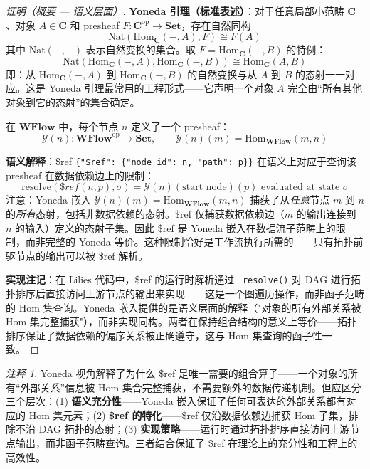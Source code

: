 \documentclass[11pt,a4paper]{article}
\theoremstyle{definition}
\theoremstyle{definition}
\theoremstyle{remark}
\newtheorem{remark}[theorem]{注释}
\newcommand{\cat}[1]{\mathbf{#1}}
\newcommand{\catWFlow}{\cat{WFlow}}
\newcommand{\catSet}{\cat{Set}}
\newcommand{\homset}[3]{\mathrm{Hom}_{#1}(#2, #3)}
\newcommand{\Yoneda}{\mathcal{Y}}
\begin{document}
\begin{proof}[证明（概要 — 语义层面）]
\textbf{Yoneda 引理（标准表述）}：对于任意局部小范畴 $\cat{C}$、对象 $A \in \cat{C}$ 和 presheaf $F: \cat{C}^{\mathrm{op}} \to \catSet$，存在自然同构
\[
\mathrm{Nat}(\homset{\cat{C}}{-}{A}, F) \cong F(A)
\]
其中 $\mathrm{Nat}(-,-)$ 表示自然变换的集合。取 $F = \homset{\cat{C}}{-}{B}$ 的特例：
\[
\mathrm{Nat}(\homset{\cat{C}}{-}{A}, \homset{\cat{C}}{-}{B}) \cong \homset{\cat{C}}{A}{B}
\]
即：从 $\homset{\cat{C}}{-}{A}$ 到 $\homset{\cat{C}}{-}{B}$ 的自然变换与从 $A$ 到 $B$ 的态射一一对应。这是 Yoneda 引理最常用的工程形式——它声明一个对象 $A$ 完全由“所有其他对象到它的态射”的集合确定。

在 $\catWFlow$ 中，每个节点 $n$ 定义了一个 presheaf：
\[
\Yoneda(n): \catWFlow^{\mathrm{op}} \to \catSet, \qquad
\Yoneda(n)(m) = \homset{\catWFlow}{m}{n}
\]

\textbf{语义解释}：\$ref \texttt{\{"\$ref": \{"node\_id": n, "path": p\}\}} 在语义上对应于查询该 presheaf 在数据依赖边上的限制：
\[
\mathrm{resolve}(\$ref(n, p), \sigma) = \Yoneda(n)(\mathrm{start\_node})(p) \text{ evaluated at state } \sigma
\]
注意：Yoneda 嵌入 $\Yoneda(n)(m) = \homset{\catWFlow}{m}{n}$ 捕获了从\emph{任意}节点 $m$ 到 $n$ 的\emph{所有}态射，包括非数据依赖的态射。\$ref 仅捕获数据依赖边（$m$ 的输出连接到 $n$ 的输入）定义的态射子集。因此 \$ref 是 Yoneda 嵌入在数据流子范畴上的限制，而非完整的 Yoneda 等价。这种限制恰好是工作流执行所需的——只有拓扑前驱节点的输出可以被 \$ref 解析。

\textbf{实现注记}：在 Lilies 代码中，\$ref 的运行时解析通过 \texttt{\_resolve()} 对 DAG 进行拓扑排序后直接访问上游节点的输出来实现——这是一个图遍历操作，而非函子范畴的 Hom 集查询。Yoneda 嵌入提供的是语义层面的解释（"对象的所有外部关系被 Hom 集完整捕获"），而非实现同构。两者在保持组合结构的意义上等价——拓扑排序保证了数据依赖的偏序关系被正确遵守，这与 Hom 集查询的函子性一致。
\end{proof}

\begin{remark}
Yoneda 视角解释了为什么 \$ref 是唯一需要的组合算子——一个对象的所有``外部关系''信息被 Hom 集合完整捕获，不需要额外的数据传递机制。但应区分三个层次：(1) \textbf{语义充分性}——Yoneda 嵌入保证了任何可表达的外部关系都有对应的 Hom 集元素；(2) \textbf{\$ref 的特化}——\$ref 仅沿数据依赖边捕获 Hom 子集，排除不沿 DAG 拓扑的态射；(3) \textbf{实现策略}——运行时通过拓扑排序直接访问上游节点输出，而非函子范畴查询。三者结合保证了 \$ref 在理论上的充分性和工程上的高效性。
\end{remark}
\end{document}
